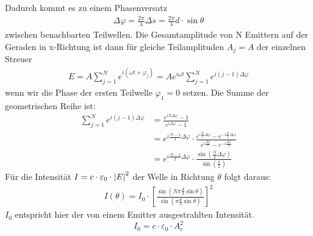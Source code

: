 \documentclass[a4paper, 11pt, ngerman, parskip=half-]{scrartcl}
\begin{document}
Dadurch kommt es zu einem Phasenversatz
\begin{align*}
    \Delta \varphi = \frac{2 \pi}{\lambda} \Delta s = \frac{2 \pi}{\lambda} d \cdot \sin \theta
\end{align*}
zwischen benachbarten Teilwellen.
Die Gesamtamplitude von N Emittern auf der Geraden in x-Richtung ist dann für gleiche Teilamplituden $A_j = A$ der einzelnen Streuer
\begin{align*}
    E = A \sum_{j=1}^{N} e^{i (\omega t + \varphi_j)} = A e^{i \omega t} \sum_{j=1}^{N} e^{i (j - 1) \Delta \varphi}
\end{align*}
wenn wir die Phase der ersten Teilwelle $\varphi_1 = 0$ setzen. Die
Summe der geometrischen Reihe ist:
\begin{align*}
    \sum_{j=1}^{N} e^{i (j -1) \Delta \varphi} & = \frac{e^{i N \Delta \varphi} - 1}{e^{i \Delta \varphi} - 1}                                                                                                                             \\
                                               & = e^{i \frac{N-1}{2} \Delta \varphi} \cdot \frac{e^{i \frac{N}{2} \Delta \varphi} - e^{-i \frac{N}{2} \Delta \varphi}}{e^{i \frac{\Delta \varphi}{2}} - e^{- i \frac{\Delta \varphi}{2}}} \\
                                               & = e^{i \frac{N-1}{2} \Delta \varphi} \cdot \frac{\sin(\frac{N}{2} \Delta \varphi)}{\sin(\frac{\varphi}{2})}
\end{align*}
Für die Intensität $I = c \cdot \varepsilon_0 \cdot \abs{E}^2$ der Welle in Richtung $\theta$ folgt daraus:
\begin{align*}
    I(\theta) = I_0 \cdot \left[ \frac{\sin(N \pi \frac{d}{\lambda} \sin\theta)}{\sin(\pi \frac{d}{\lambda} \sin \theta)} \right]^2
\end{align*}
$I_0$ entspricht hier der von einem Emitter ausgestrahlten Intensität.
\[I_0 = c \cdot \varepsilon_0 \cdot A_e^2\]
\end{document}
